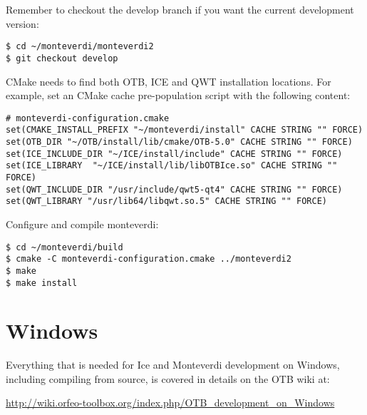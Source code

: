 Remember to checkout the develop branch if you want the current development version:
\begin{verbatim}
$ cd ~/monteverdi/monteverdi2
$ git checkout develop
\end{verbatim}

CMake needs to find both OTB, ICE and QWT installation locations.
For example, set an CMake cache pre-population script with the following content:
\begin{verbatim}
# monteverdi-configuration.cmake
set(CMAKE_INSTALL_PREFIX "~/monteverdi/install" CACHE STRING "" FORCE)
set(OTB_DIR "~/OTB/install/lib/cmake/OTB-5.0" CACHE STRING "" FORCE)
set(ICE_INCLUDE_DIR "~/ICE/install/include" CACHE STRING "" FORCE)
set(ICE_LIBRARY  "~/ICE/install/lib/libOTBIce.so" CACHE STRING "" FORCE)
set(QWT_INCLUDE_DIR "/usr/include/qwt5-qt4" CACHE STRING "" FORCE)
set(QWT_LIBRARY "/usr/lib64/libqwt.so.5" CACHE STRING "" FORCE)
\end{verbatim}

Configure and compile monteverdi:
\begin{verbatim}
$ cd ~/monteverdi/build
$ cmake -C monteverdi-configuration.cmake ../monteverdi2
$ make
$ make install
\end{verbatim}

\section{Windows}

Everything that is needed for Ice and Monteverdi development on Windows, including compiling from source, is covered in details on the OTB wiki at:
\begin{center}
\url{http://wiki.orfeo-toolbox.org/index.php/OTB_development_on_Windows}
\end{center}
